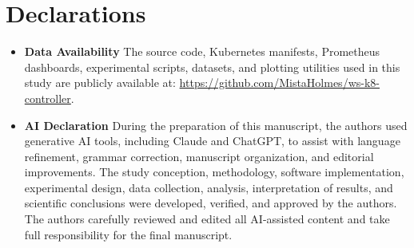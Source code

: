 \documentclass[twocolumn]{svjour3}
\begin{document}
\section*{Declarations}

\begin{itemize}
\item \textbf{Data Availability} The source code, Kubernetes manifests, Prometheus dashboards, experimental scripts, datasets, and plotting utilities used in this study are publicly available at: \url{https://github.com/MistaHolmes/ws-k8-controller}.
\item \textbf{AI Declaration} During the preparation of this manuscript, the authors used generative AI tools, including Claude and ChatGPT, to assist with language refinement, grammar correction, manuscript organization, and editorial improvements. The study conception, methodology, software implementation, experimental design, data collection, analysis, interpretation of results, and scientific conclusions were developed, verified, and approved by the authors. The authors carefully reviewed and edited all AI-assisted content and take full responsibility for the final manuscript.
\end{itemize}



\end{document}
